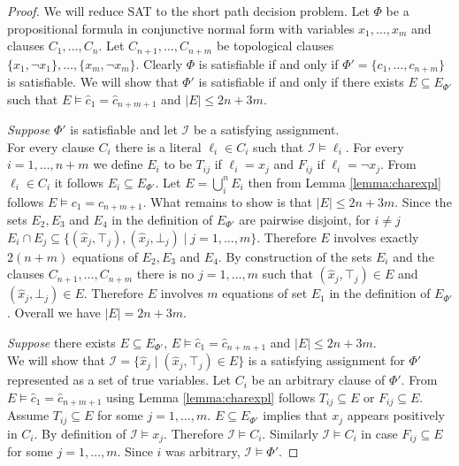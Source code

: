 \begin{proof}

We will reduce SAT to the short path decision problem.
Let $\Phi$ be a propositional formula in conjunctive normal form with variables $x_1,\ldots,x_m$ and clauses $C_1,\ldots,C_n$.
Let $C_{n+1},\ldots,C_{n+m}$ be topological clauses $\{x_1, \neg x_1\},\ldots,\{x_m,\neg x_m\}$.
Clearly $\Phi$ is satisfiable if and only if $\Phi' = \{c_1,\ldots,c_{n+m}\}$ is satisfiable.
We will show that $\Phi'$ is satisfiable if and only if there exists $E \subseteq E_{\Phi'}$ such that $E \models \hat{c}_1 = \hat{c}_{n+m+1}$ and $|E| \leq 2n + 3m$.

\emph{Suppose} $\Phi'$ is satisfiable and let $\mathcal{I}$ be a satisfying assignment.\\
For every clause $C_i$ there is a literal $\ell_i \in C_i$ such that $\mathcal{I} \models \ell_i$.
For every $i = 1,\ldots,n+m$ we define $E_i$ to be $T_{ij}$ if $\ell_i = x_j$ and $F_{ij}$ if $\ell_i = \neg x_j$.
From $\ell_i \in C_i$ it follows $E_i \subseteq E_{\Phi'}$.
Let $E = \bigcup_i^n E_i$ then from Lemma \ref{lemma:charexpl} follows $E \models c_1 = c_{n+m+1}$.
What remains to show is that $|E| \leq 2n + 3m$.
Since the sets $E_2, E_3$ and $E_4$ in the definition of $E_{\Phi'}$ are pairwise disjoint, for $i \neq j$ $E_i \cap E_j \subseteq \{(\hat{x}_j,\top_j),(\hat{x}_j,\bot_j) \mid j = 1,\ldots,m\}$.
Therefore $E$ involves exactly $2(n+m)$ equations of $E_2, E_3$ and $E_4$.
By construction of the sets $E_i$ and the clauses $C_{n+1},\ldots,C_{n+m}$ there is no $j = 1,\ldots,m$ such that $(\hat{x}_j,\top_j) \in E$ and $(\hat{x}_j,\bot_j) \in E$.
Therefore $E$ involves $m$ equations of set $E_1$ in the definition of $E_{\Phi'}$.
Overall we have $|E| = 2n + 3m$.

\emph{Suppose} there exists $E \subseteq E_{\Phi'}$, $E \models \hat{c}_1 = \hat{c}_{n+m+1}$ and $|E| \leq 2n + 3m$.\\
We will show that $\mathcal{I} = \{\hat{x}_j \mid (\hat{x}_j,\top_j) \in E\}$ is a satisfying assignment for $\Phi'$ represented as a set of true variables.
Let $C_i$ be an arbitrary clause of $\Phi'$.
From $E \models \hat{c}_1 = \hat{c}_{n+m+1}$ using Lemma \ref{lemma:charexpl} follows $T_{ij} \subseteq E$ or $F_{ij} \subseteq E$.
Assume $T_{ij} \subseteq E$ for some $j = 1,\ldots,m$.
$E \subseteq E_{\Phi'}$ implies that $x_j$ appears positively in $C_i$. 
By definition of $\mathcal{I} \models x_j$. 
Therefore $\mathcal{I} \models C_i$.
Similarly $\mathcal{I} \models C_i$ in case $F_{ij} \subseteq E$ for some $j = 1,\ldots,m$.
Since $i$ was arbitrary, $\mathcal{I} \models \Phi'$.

\end{proof}
